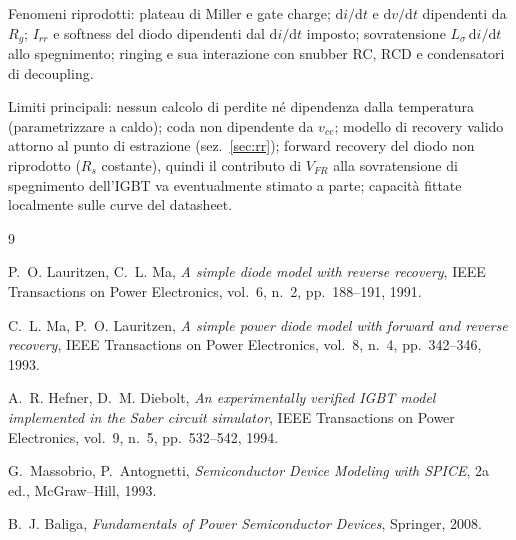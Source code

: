 \documentclass[11pt,a4paper]{article}
\newcommand{\ud}{\mathrm{d}}
\begin{document}
Fenomeni riprodotti: plateau di Miller e gate charge; $\ud i/\ud t$ e
$\ud v/\ud t$ dipendenti da $R_g$; $I_{rr}$ e softness del diodo
dipendenti dal $\ud i/\ud t$ imposto; sovratensione
$L_\sigma\,\ud i/\ud t$ allo spegnimento; ringing e sua interazione con
snubber RC, RCD e condensatori di decoupling.

Limiti principali: nessun calcolo di perdite n\'e dipendenza dalla
temperatura (parametrizzare a caldo); coda non dipendente da $v_{ce}$;
modello di recovery valido attorno al punto di estrazione
(sez.~\ref{sec:rr}); forward recovery del diodo non riprodotto ($R_s$
costante), quindi il contributo di $V_{FR}$ alla sovratensione di
spegnimento dell'IGBT va eventualmente stimato a parte; capacit\`a
fittate localmente sulle curve del datasheet.

\begin{thebibliography}{9}

P.~O. Lauritzen, C.~L. Ma,
\emph{A simple diode model with reverse recovery},
IEEE Transactions on Power Electronics, vol.~6, n.~2, pp.~188--191, 1991.

C.~L. Ma, P.~O. Lauritzen,
\emph{A simple power diode model with forward and reverse recovery},
IEEE Transactions on Power Electronics, vol.~8, n.~4, pp.~342--346, 1993.

A.~R. Hefner, D.~M. Diebolt,
\emph{An experimentally verified IGBT model implemented in the Saber
circuit simulator},
IEEE Transactions on Power Electronics, vol.~9, n.~5, pp.~532--542, 1994.

G.~Massobrio, P.~Antognetti,
\emph{Semiconductor Device Modeling with SPICE}, 2a ed.,
McGraw--Hill, 1993.

B.~J. Baliga,
\emph{Fundamentals of Power Semiconductor Devices},
Springer, 2008.

\end{thebibliography}
\end{document}
